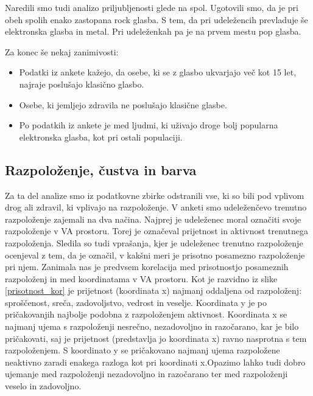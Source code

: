 \documentclass[a4paper, 12pt]{book}
\begin{document}
{Naredili smo tudi analizo priljubljenosti glede na spol. Ugotovili smo, da je pri obeh spolih enako zastopana rock glasba. S tem, da pri udeležencih prevladuje še elektronska glasba in metal. Pri udeleženkah pa je na prvem mestu pop glasba. 

Za konec še nekaj zanimivosti:
\begin{itemize}
\item Podatki iz ankete kažejo, da osebe, ki se z glasbo ukvarjajo več kot 15 let, najraje poslušajo klasično glasbo.
\item Osebe, ki jemljejo zdravila ne poslušajo klasične glasbe.
\item Po podatkih iz ankete je med ljudmi, ki uživajo droge bolj popularna elektronska glasba, kot pri ostali populaciji.
\end{itemize}

\subsection{Razpoloženje, čustva in barva}
\label{razcusbar}

Za ta del analize smo iz podatkovne zbirke odstranili vse, ki so bili pod vplivom drog ali zdravil, ki vplivajo na razpoloženje. V anketi smo udeleženčevo trenutno razpoloženje zajemali na dva načina. Najprej je udeleženec moral označiti svoje razpoloženje v VA prostoru. Torej je označeval prijetnost in aktivnost trenutnega razpoloženja. Sledila so tudi vprašanja, kjer je udeleženec trenutno razpoloženje ocenjeval z tem, da je označil, v kakšni meri je prisotno posamezno razpoloženje pri njem. Zanimala nas je predvsem korelacija med prisotnostjo posameznih razpoloženj in med koordinatama v VA prostoru. Kot je razvidno iz slike \ref{prisotnost_kor} je prijetnost (koordinata x) najmanj oddaljena od razpoloženj: sproščenost, sreča, zadovoljstvo, vedrost in veselje. Koordinata y je po pričakovanjih najbolje podobna z razpoloženjem aktivnost. Koordinata x se najmanj ujema s razpoloženji nesrečno, nezadovoljno in razočarano, kar je bilo pričakovati, saj je prijetnost (predstavlja jo koordinata x) ravno nasprotna s tem razpoloženjem. S koordinato y se pričakovano najmanj ujema razpoložene neaktivno zaradi enakega razloga kot pri koordinati x.Opazimo lahko tudi dobro ujemanje med razpoloženji nezadovoljno in razočarano ter med razpoloženji veselo in zadovoljno. 

}
\end{document}
